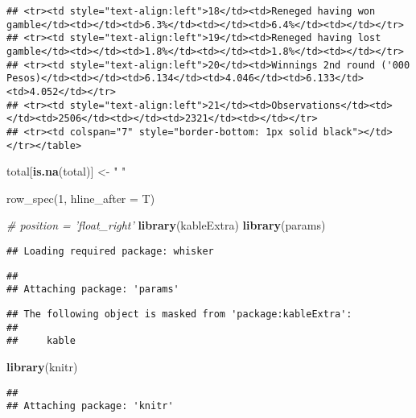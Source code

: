 \documentclass[]{tufte-handout}
\newenvironment{Shaded}{\begin{snugshade}}{\end{snugshade}}
\newcommand{\KeywordTok}[1]{\textcolor[rgb]{0.13,0.29,0.53}{\textbf{#1}}}
\newcommand{\StringTok}[1]{\textcolor[rgb]{0.31,0.60,0.02}{#1}}
\newcommand{\CommentTok}[1]{\textcolor[rgb]{0.56,0.35,0.01}{\textit{#1}}}
\newcommand{\NormalTok}[1]{#1}
\begin{document}
\begin{verbatim}
## <tr><td style="text-align:left">18</td><td>Reneged having won gamble</td><td></td><td>6.3%</td><td></td><td>6.4%</td><td></td></tr>
## <tr><td style="text-align:left">19</td><td>Reneged having lost gamble</td><td></td><td>1.8%</td><td></td><td>1.8%</td><td></td></tr>
## <tr><td style="text-align:left">20</td><td>Winnings 2nd round ('000 Pesos)</td><td></td><td>6.134</td><td>4.046</td><td>6.133</td><td>4.052</td></tr>
## <tr><td style="text-align:left">21</td><td>Observations</td><td></td><td>2506</td><td></td><td>2321</td><td></td></tr>
## <tr><td colspan="7" style="border-bottom: 1px solid black"></td></tr></table>
\end{verbatim}

\begin{Shaded}
\begin{Highlighting}[]
\NormalTok{total[}\KeywordTok{is.na}\NormalTok{(total)] <-}\StringTok{ " "}
\end{Highlighting}
\end{Shaded}

row\_spec(1, hline\_after = T)

\begin{Shaded}
\begin{Highlighting}[]
\CommentTok{# position = 'float_right'}
\KeywordTok{library}\NormalTok{(kableExtra)}
\KeywordTok{library}\NormalTok{(params)}
\end{Highlighting}
\end{Shaded}

\begin{verbatim}
## Loading required package: whisker
\end{verbatim}

\begin{verbatim}
## 
## Attaching package: 'params'
\end{verbatim}

\begin{verbatim}
## The following object is masked from 'package:kableExtra':
## 
##     kable
\end{verbatim}

\begin{Shaded}
\begin{Highlighting}[]
\KeywordTok{library}\NormalTok{(knitr)}
\end{Highlighting}
\end{Shaded}

\begin{verbatim}
## 
## Attaching package: 'knitr'
\end{verbatim}
\end{document}
